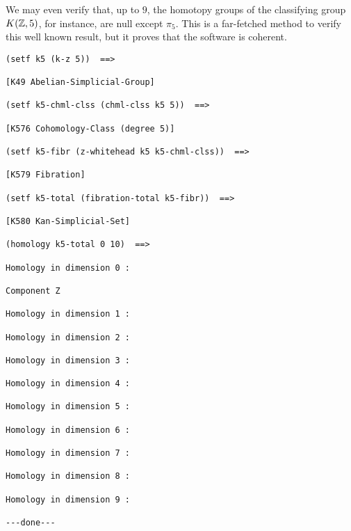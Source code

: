We may even verify that, up to $9$, the homotopy groups of the classifying group $K({\mathbb{Z}},5)$, for instance,
are null except $\pi_5$. This is a far-fetched method to verify this well known result, but
it proves that the software is coherent.
{\footnotesize\begin{verbatim}
(setf k5 (k-z 5))  ==>

[K49 Abelian-Simplicial-Group]

(setf k5-chml-clss (chml-clss k5 5))  ==>

[K576 Cohomology-Class (degree 5)]

(setf k5-fibr (z-whitehead k5 k5-chml-clss))  ==>

[K579 Fibration]

(setf k5-total (fibration-total k5-fibr))  ==>

[K580 Kan-Simplicial-Set]

(homology k5-total 0 10)  ==>

Homology in dimension 0 :

Component Z

Homology in dimension 1 :

Homology in dimension 2 :

Homology in dimension 3 :

Homology in dimension 4 :

Homology in dimension 5 :

Homology in dimension 6 :

Homology in dimension 7 :

Homology in dimension 8 :

Homology in dimension 9 :

---done---
\end{verbatim}}

